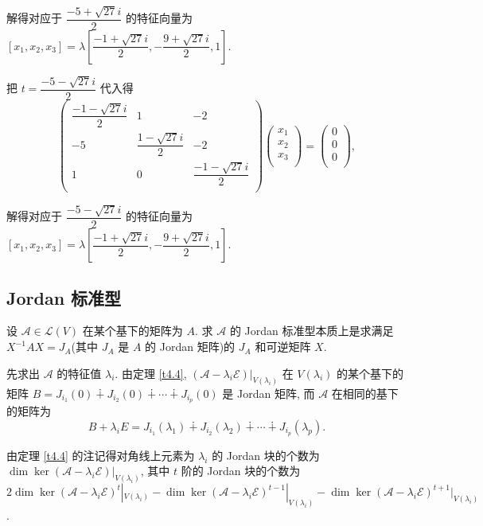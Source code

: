 \documentclass[color=black,device=normal,lang=cn,mode=geye]{elegantnote}
\begin{document}
\begin{solution}
    解得对应于 $\dfrac{-5+\sqrt{27}i}{2}$ 的特征向量为 $[x_1,x_2,x_3]=\lambda\left[\dfrac{-1+\sqrt{27}i}{2},-\dfrac{9+\sqrt{27}i}{2},1\right]$.

    把 $t=\dfrac{-5-\sqrt{27}i}{2}$ 代入得
    \[\begin{pmatrix}
        \dfrac{-1-\sqrt{27}i}{2} & 1 & -2 \\
        -5 & \dfrac{1-\sqrt{27}i}{2} & -2 \\
        1 & 0 & \dfrac{-1-\sqrt{27}i}{2} \\
    \end{pmatrix}\begin{pmatrix}
        x_1 \\
        x_2 \\
        x_3 \\
    \end{pmatrix}=\begin{pmatrix}
        0 \\
        0 \\
        0 \\
    \end{pmatrix},\]

    解得对应于 $\dfrac{-5-\sqrt{27}i}{2}$ 的特征向量为 $[x_1,x_2,x_3]=\lambda\left[\dfrac{-1+\sqrt{27}i}{2},-\dfrac{9+\sqrt{27}i}{2},1\right]$.
\end{solution}
\subsection{Jordan 标准型}
设 $\mathcal{A}\in\mathcal{L}(V)$ 在某个基下的矩阵为 $A$. 求 $\mathcal{A}$ 的 Jordan 标准型本质上是求满足 $X^{-1}AX=J_A$(其中 $J_A$ 是 $A$ 的 Jordan 矩阵)的 $J_A$ 和可逆矩阵 $X$.

先求出 $\mathcal{A}$ 的特征值 $\lambda_i$. 由定理 \ref{t4.4}, $(\mathcal{A}-\lambda_i\mathcal{E})|_{V(\lambda_i)}$ 在 $V(\lambda_i)$ 的某个基下的矩阵 $B=J_{i_1}(0)\dotplus J_{i_2}(0)\dotplus\cdots\dotplus J_{i_p}(0)$ 是 Jordan 矩阵, 而 $\mathcal{A}$ 在相同的基下的矩阵为
\[B+\lambda_iE=J_{i_1}(\lambda_1)\dotplus J_{i_2}(\lambda_2)\dotplus\cdots\dotplus J_{i_p}(\lambda_p).\]

由定理 \ref{t4.4} 的注记得对角线上元素为 $\lambda_i$ 的 Jordan 块的个数为 $\dim\ker(\mathcal{A}-\lambda_i\mathcal{E})|_{V(\lambda_i)}$, 其中 $t$ 阶的 Jordan 块的个数为 $2\dim\ker(\mathcal{A}-\lambda_i\mathcal{E})^t|_{V(\lambda_i)}-\dim\ker(\mathcal{A}-\lambda_i\mathcal{E})^{t-1}|_{V(\lambda_i)}-\dim\ker(\mathcal{A}-\lambda_i\mathcal{E})^{t+1}|_{V(\lambda_i)}$.
\end{document}
